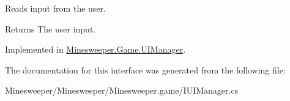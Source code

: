 Reads input from the user. 

\begin{DoxyReturn}{Returns}
The user input.
\end{DoxyReturn}


Implemented in \hyperlink{class_minesweeper_1_1_game_1_1_u_i_manager_abf069aaf0ff743c8b5f27ea3dba46be4}{Minesweeper.\+Game.\+U\+I\+Manager}.



The documentation for this interface was generated from the following file\+:\begin{DoxyCompactItemize}
\item 
Minesweeper/\+Minesweeper/\+Minesweeper.\+game/I\+U\+I\+Manager.\+cs\end{DoxyCompactItemize}

